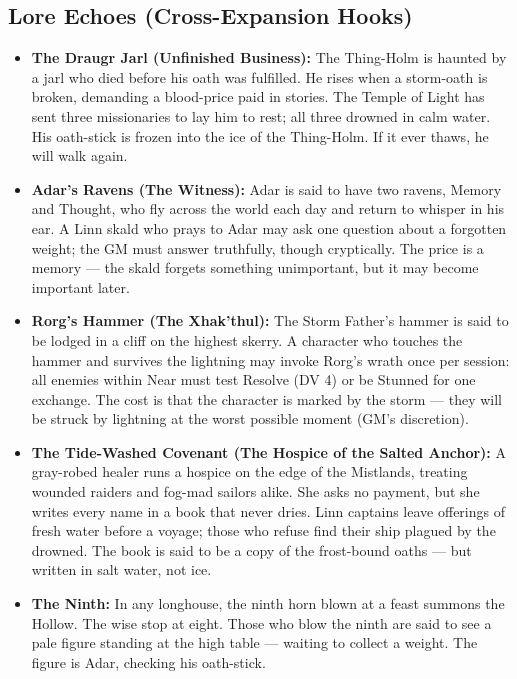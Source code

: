 \subsection*{Lore Echoes (Cross-Expansion Hooks)}
\begin{itemize}
  \item \textbf{The Draugr Jarl (Unfinished Business):} The Thing-Holm is haunted by a jarl who died before his oath was fulfilled. He rises when a storm-oath is broken, demanding a blood-price paid in stories. The Temple of Light has sent three missionaries to lay him to rest; all three drowned in calm water. His oath-stick is frozen into the ice of the Thing-Holm. If it ever thaws, he will walk again.
  \item \textbf{Adar's Ravens (The Witness):} Adar is said to have two ravens, Memory and Thought, who fly across the world each day and return to whisper in his ear. A Linn skald who prays to Adar may ask one question about a forgotten weight; the GM must answer truthfully, though cryptically. The price is a memory --- the skald forgets something unimportant, but it may become important later.
  \item \textbf{Rorg's Hammer (The Xhak'thul):} The Storm Father's hammer is said to be lodged in a cliff on the highest skerry. A character who touches the hammer and survives the lightning may invoke Rorg's wrath once per session: all enemies within Near must test Resolve (DV 4) or be Stunned for one exchange. The cost is that the character is marked by the storm --- they will be struck by lightning at the worst possible moment (GM's discretion).
  \item \textbf{The Tide-Washed Covenant (The Hospice of the Salted Anchor):} A gray-robed healer runs a hospice on the edge of the Mistlands, treating wounded raiders and fog-mad sailors alike. She asks no payment, but she writes every name in a book that never dries. Linn captains leave offerings of fresh water before a voyage; those who refuse find their ship plagued by the drowned. The book is said to be a copy of the frost-bound oaths --- but written in salt water, not ice.
  \item \textbf{The Ninth:} In any longhouse, the ninth horn blown at a feast summons the Hollow. The wise stop at eight. Those who blow the ninth are said to see a pale figure standing at the high table --- waiting to collect a weight. The figure is Adar, checking his oath-stick.
\end{itemize}

